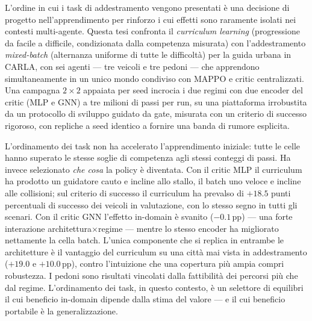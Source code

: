 \documentclass[12pt,a4paper,oneside]{report}
\begin{document}
\clearpage
\null\vfil
\begin{center}%
  \bfseries \abstractname
\end{center}
L'ordine in cui i task di addestramento vengono presentati è una
decisione di progetto nell'apprendimento per rinforzo i cui effetti sono
raramente isolati nei contesti multi-agente. Questa tesi confronta il
\emph{curriculum learning} (progressione da facile a difficile,
condizionata dalla competenza misurata) con l'addestramento
\emph{mixed-batch} (alternanza uniforme di tutte le difficoltà) per la
guida urbana in CARLA, con sei agenti --- tre veicoli e tre pedoni ---
che apprendono simultaneamente in un unico mondo condiviso con MAPPO e
critic centralizzati. Una campagna $2\times2$ appaiata per seed incrocia
i due regimi con due encoder del critic (MLP e GNN) a tre milioni di
passi per run, su una piattaforma irrobustita da un protocollo di
sviluppo guidato da gate, misurata con un criterio di successo rigoroso,
con repliche a seed identico a fornire una banda di rumore esplicita.

L'ordinamento dei task non ha accelerato l'apprendimento iniziale: tutte
le celle hanno superato le stesse soglie di competenza agli stessi
conteggi di passi. Ha invece selezionato \emph{che cosa} la policy è
diventata. Con il critic MLP il curriculum ha prodotto un guidatore
cauto e incline allo stallo, il batch uno veloce e incline alle
collisioni; sul criterio di successo il curriculum ha prevalso di
$+18.5$ punti percentuali di successo dei veicoli in valutazione, con lo
stesso segno in tutti gli scenari. Con il critic GNN l'effetto in-domain
è svanito ($-0.1$\,pp) --- una forte interazione
architettura$\times$regime --- mentre lo stesso encoder ha migliorato
nettamente la cella batch. L'unica componente che si replica in entrambe
le architetture è il vantaggio del curriculum su una città mai vista in
addestramento ($+19.0$ e $+10.0$\,pp), contro l'intuizione che una
copertura più ampia compri robustezza. I pedoni sono risultati vincolati
dalla fattibilità dei percorsi più che dal regime. L'ordinamento dei
task, in questo contesto, è un selettore di equilibri il cui beneficio
in-domain dipende dalla stima del valore --- e il cui beneficio
portabile è la generalizzazione.
\par\vfil\null
\end{document}
